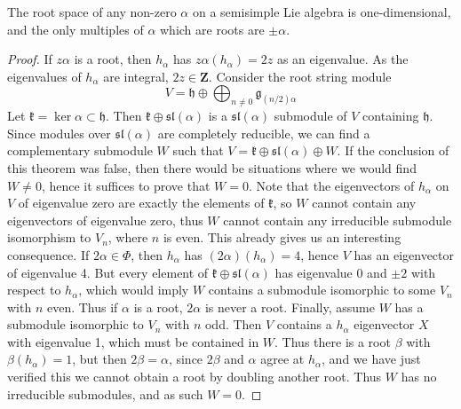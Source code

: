 \begin{theorem}
    The root space of any non-zero $\alpha$ on a semisimple Lie algebra is one-dimensional, and the only multiples of $\alpha$ which are roots are $\pm \alpha$.
\end{theorem}
\begin{proof}
    If $z\alpha$ is a root, then $h_\alpha$ has $z\alpha(h_\alpha) = 2z$ as an eigenvalue. As the eigenvalues of $h_\alpha$ are integral, $2z \in \mathbf{Z}$. Consider the root string module
    \[ V = \mathfrak{h} \oplus \bigoplus_{n \neq 0} \mathfrak{g}_{(n/2)\alpha} \]
    Let $\mathfrak{k} = \ker \alpha \subset \mathfrak{h}$. Then $\mathfrak{k} \oplus \mathfrak{sl}(\alpha)$ is a $\mathfrak{sl}(\alpha)$ submodule of $V$ containing $\mathfrak{h}$. Since modules over $\mathfrak{sl}(\alpha)$ are completely reducible, we can find a complementary submodule $W$ such that $V = \mathfrak{k} \oplus \mathfrak{sl}(\alpha) \oplus W$. If the conclusion of this theorem was false, then there would be situations where we would find $W \neq 0$, hence it suffices to prove that $W = 0$. Note that the eigenvectors of $h_\alpha$ on $V$ of eigenvalue zero are exactly the elements of $\mathfrak{k}$, so $W$ cannot contain any eigenvectors of eigenvalue zero, thus $W$ cannot contain any irreducible submodule isomorphism to $V_n$, where $n$ is even. This already gives us an interesting consequence. If $2\alpha \in \Phi$, then $h_\alpha$ has $(2\alpha)(h_\alpha) = 4$, hence $V$ has an eigenvector of eigenvalue 4. But every element of $\mathfrak{k} \oplus \mathfrak{sl}(\alpha)$ has eigenvalue $0$ and $\pm 2$ with respect to $h_\alpha$, which would imply $W$ contains a submodule isomorphic to some $V_n$ with $n$ even. Thus if $\alpha$ is a root, $2 \alpha$ is never a root. Finally, assume $W$ has a submodule isomorphic to $V_n$ with $n$ odd. Then $V$ contains a $h_\alpha$ eigenvector $X$ with eigenvalue 1, which must be contained in $W$. Thus there is a root $\beta$ with $\beta(h_\alpha) = 1$, but then $2\beta = \alpha$, since $2\beta$ and $\alpha$ agree at $h_\alpha$, and we have just verified this we cannot obtain a root by doubling another root. Thus $W$ has no irreducible submodules, and as such $W = 0$.
\end{proof}

